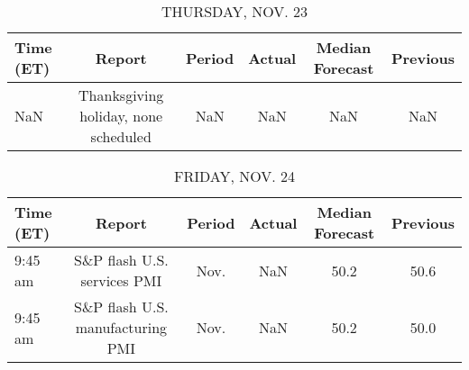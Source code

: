 \documentclass{article}%
\begin{document}
%


\begin{table}[htbp]%
\caption{THURSDAY, NOV. 23}%
\centering%
\begin{adjustbox}{width=1\textwidth}%
\begin{tabular}{lccccc}
\toprule
Time (ET) &                               Report & Period & Actual & Median Forecast & Previous \\
\midrule
      NaN & Thanksgiving holiday, none scheduled &    NaN &    NaN &             NaN &      NaN \\
\bottomrule
\end{tabular}
%
\end{adjustbox}%
\end{table}

%


\begin{table}[htbp]%
\caption{FRIDAY, NOV. 24}%
\centering%
\begin{adjustbox}{width=1\textwidth}%
\begin{tabular}{lccccc}
\toprule
Time (ET) &                           Report & Period & Actual & Median Forecast & Previous \\
\midrule
  9:45 am &      S\&P flash U.S. services PMI &   Nov. &    NaN &            50.2 &     50.6 \\
  9:45 am & S\&P flash U.S. manufacturing PMI &   Nov. &    NaN &            50.2 &     50.0 \\
\bottomrule
\end{tabular}
%
\end{adjustbox}%
\end{table}
\end{document}
